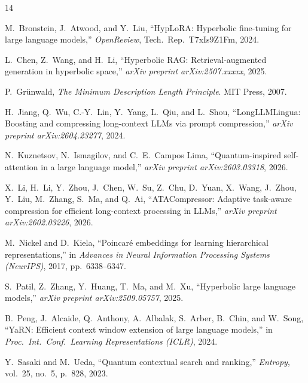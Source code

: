 \documentclass[11pt,a4paper]{article}
\begin{document}
\begin{thebibliography}{14}

M.~Bronstein, J.~Atwood, and Y.~Liu,
``HypLoRA: Hyperbolic fine-tuning for large language models,''
\emph{OpenReview}, Tech.\ Rep.\ T7xIs9Z1Fm, 2024.

L.~Chen, Z.~Wang, and H.~Li,
``Hyperbolic RAG: Retrieval-augmented generation in hyperbolic space,''
\emph{arXiv preprint arXiv:2507.xxxxx}, 2025.

P.~Gr\"{u}nwald,
\emph{The Minimum Description Length Principle}.
MIT Press, 2007.

H.~Jiang, Q.~Wu, C.-Y.~Lin, Y.~Yang, L.~Qiu, and L.~Shou,
``LongLLMLingua: Boosting and compressing long-context {LLMs} via prompt
compression,''
\emph{arXiv preprint arXiv:2604.23277}, 2024.

N.~Kuznetsov, N.~Ismagilov, and C.~E.~Campos Lima,
``Quantum-inspired self-attention in a large language model,''
\emph{arXiv preprint arXiv:2603.03318}, 2026.

X.~Li, H.~Li, Y.~Zhou, J.~Chen, W.~Su, Z.~Chu, D.~Yuan, X.~Wang,
J.~Zhou, Y.~Liu, M.~Zhang, S.~Ma, and Q.~Ai,
``{ATACompressor}: Adaptive task-aware compression for efficient
long-context processing in {LLMs},''
\emph{arXiv preprint arXiv:2602.03226}, 2026.

M.~Nickel and D.~Kiela,
``Poincar\'{e} embeddings for learning hierarchical representations,''
in \emph{Advances in Neural Information Processing Systems (NeurIPS)},
2017, pp.~6338--6347.

S.~Patil, Z.~Zhang, Y.~Huang, T.~Ma, and M.~Xu,
``Hyperbolic large language models,''
\emph{arXiv preprint arXiv:2509.05757}, 2025.

B.~Peng, J.~Alcaide, Q.~Anthony, A.~Albalak, S.~Arber, B.~Chin,
and W.~Song,
``{YaRN}: Efficient context window extension of large language models,''
in \emph{Proc.\ Int.\ Conf.\ Learning Representations (ICLR)}, 2024.

Y.~Sasaki and M.~Ueda,
``Quantum contextual search and ranking,''
\emph{Entropy}, vol.~25, no.~5, p.~828, 2023.


\end{thebibliography}
\end{document}
